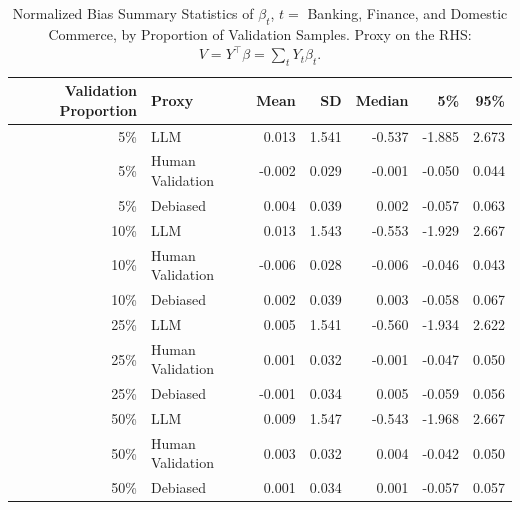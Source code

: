 \begin{table}

\caption{Normalized Bias Summary Statistics of $\beta_{t}$, $t=$ Banking, Finance, and Domestic Commerce, by Proportion of Validation Samples.
      Proxy on the RHS: $V = Y^\top \beta = \sum_{t} Y_t \beta_t$.}
\centering
\begin{tabular}[t]{rlrrrrr}
\toprule
Validation Proportion & Proxy & Mean & SD & Median & 5\% & 95\%\\
\midrule
5\% & LLM & 0.013 & 1.541 & -0.537 & -1.885 & 2.673\\
5\% & Human Validation & -0.002 & 0.029 & -0.001 & -0.050 & 0.044\\
5\% & Debiased & 0.004 & 0.039 & 0.002 & -0.057 & 0.063\\
10\% & LLM & 0.013 & 1.543 & -0.553 & -1.929 & 2.667\\
10\% & Human Validation & -0.006 & 0.028 & -0.006 & -0.046 & 0.043\\
10\% & Debiased & 0.002 & 0.039 & 0.003 & -0.058 & 0.067\\
25\% & LLM & 0.005 & 1.541 & -0.560 & -1.934 & 2.622\\
25\% & Human Validation & 0.001 & 0.032 & -0.001 & -0.047 & 0.050\\
25\% & Debiased & -0.001 & 0.034 & 0.005 & -0.059 & 0.056\\
50\% & LLM & 0.009 & 1.547 & -0.543 & -1.968 & 2.667\\
50\% & Human Validation & 0.003 & 0.032 & 0.004 & -0.042 & 0.050\\
50\% & Debiased & 0.001 & 0.034 & 0.001 & -0.057 & 0.057\\
\bottomrule
\end{tabular}
\end{table}
